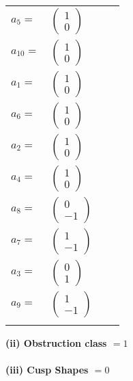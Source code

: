 \documentclass[1p]{elsarticle_modified}
\theoremstyle{definition}
\begin{document}
\begin{tabular}{m{7pt} m{180pt} m{7pt} m{180pt} }
\flushright $a_{5}=$&$\begin{pmatrix}1\\0\end{pmatrix}$ \\
\flushright $a_{10}=$&$\begin{pmatrix}1\\0\end{pmatrix}$ \\
\flushright $a_{1}=$&$\begin{pmatrix}1\\0\end{pmatrix}$ \\
\flushright $a_{6}=$&$\begin{pmatrix}1\\0\end{pmatrix}$ \\
\flushright $a_{2}=$&$\begin{pmatrix}1\\0\end{pmatrix}$ \\
\flushright $a_{4}=$&$\begin{pmatrix}1\\0\end{pmatrix}$ \\
\flushright $a_{8}=$&$\begin{pmatrix}0\\-1\end{pmatrix}$ \\
\flushright $a_{7}=$&$\begin{pmatrix}1\\-1\end{pmatrix}$ \\
\flushright $a_{3}=$&$\begin{pmatrix}0\\1\end{pmatrix}$ \\
\flushright $a_{9}=$&$\begin{pmatrix}1\\-1\end{pmatrix}$\\&\end{tabular}
\flushleft \textbf{(ii) Obstruction class $= 1$}\\~\\
\flushleft \textbf{(iii) Cusp Shapes $= 0$}\\~\\
\end{document}
